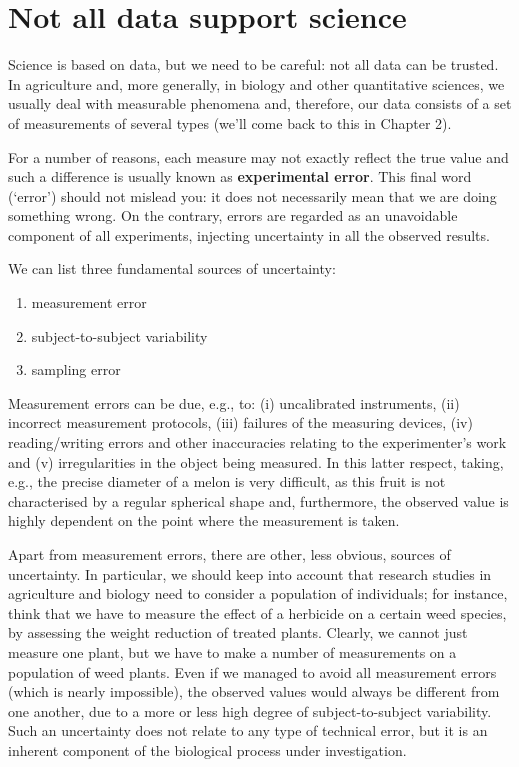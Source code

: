 \documentclass[a4paper,12pt,oneside]{book}
\providecommand{\tightlist}{%
  \setlength{\itemsep}{0pt}\setlength{\parskip}{0pt}}
\begin{document}
\hypertarget{not-all-data-support-science}{%
\section{Not all data support science}\label{not-all-data-support-science}}

Science is based on data, but we need to be careful: not all data can be trusted. In agriculture and, more generally, in biology and other quantitative sciences, we usually deal with measurable phenomena and, therefore, our data consists of a set of measurements of several types (we'll come back to this in Chapter 2).

For a number of reasons, each measure may not exactly reflect the true value and such a difference is usually known as \textbf{experimental error}. This final word (`error') should not mislead you: it does not necessarily mean that we are doing something wrong. On the contrary, errors are regarded as an unavoidable component of all experiments, injecting uncertainty in all the observed results.

We can list three fundamental sources of uncertainty:

\begin{enumerate}
\def\labelenumi{\arabic{enumi}.}
\tightlist
\item
  measurement error
\item
  subject-to-subject variability
\item
  sampling error
\end{enumerate}

Measurement errors can be due, e.g., to: (i) uncalibrated instruments, (ii) incorrect measurement protocols, (iii) failures of the measuring devices, (iv) reading/writing errors and other inaccuracies relating to the experimenter's work and (v) irregularities in the object being measured. In this latter respect, taking, e.g., the precise diameter of a melon is very difficult, as this fruit is not characterised by a regular spherical shape and, furthermore, the observed value is highly dependent on the point where the measurement is taken.

Apart from measurement errors, there are other, less obvious, sources of uncertainty. In particular, we should keep into account that research studies in agriculture and biology need to consider a population of individuals; for instance, think that we have to measure the effect of a herbicide on a certain weed species, by assessing the weight reduction of treated plants. Clearly, we cannot just measure one plant, but we have to make a number of measurements on a population of weed plants. Even if we managed to avoid all measurement errors (which is nearly impossible), the observed values would always be different from one another, due to a more or less high degree of subject-to-subject variability. Such an uncertainty does not relate to any type of technical error, but it is an inherent component of the biological process under investigation.
\end{document}
